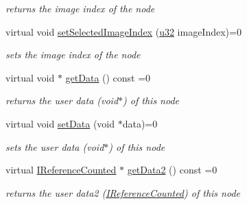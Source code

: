 \begin{DoxyCompactItemize}
\begin{DoxyCompactList}\small\item\em returns the image index of the node \end{DoxyCompactList}\item 
\mbox{\label{classirr_1_1gui_1_1IGUITreeViewNode_a21e99d3f1912e859e01b0cbc9fce638d}} 
virtual void \hyperlink{classirr_1_1gui_1_1IGUITreeViewNode_a21e99d3f1912e859e01b0cbc9fce638d}{set\+Selected\+Image\+Index} (\hyperlink{namespaceirr_a0416a53257075833e7002efd0a18e804}{u32} image\+Index)=0
\begin{DoxyCompactList}\small\item\em sets the image index of the node \end{DoxyCompactList}\item 
\mbox{\label{classirr_1_1gui_1_1IGUITreeViewNode_aa8e6747bdefb5cc8423b736c5dcefb21}} 
virtual void $\ast$ \hyperlink{classirr_1_1gui_1_1IGUITreeViewNode_aa8e6747bdefb5cc8423b736c5dcefb21}{get\+Data} () const =0
\begin{DoxyCompactList}\small\item\em returns the user data (void$\ast$) of this node \end{DoxyCompactList}\item 
\mbox{\label{classirr_1_1gui_1_1IGUITreeViewNode_a2da4071958b479dbd5799d3834a0db77}} 
virtual void \hyperlink{classirr_1_1gui_1_1IGUITreeViewNode_a2da4071958b479dbd5799d3834a0db77}{set\+Data} (void $\ast$data)=0
\begin{DoxyCompactList}\small\item\em sets the user data (void$\ast$) of this node \end{DoxyCompactList}\item 
\mbox{\label{classirr_1_1gui_1_1IGUITreeViewNode_a2fef005441c41e47a4df5c0cfd1a4b4e}} 
virtual \hyperlink{classirr_1_1IReferenceCounted}{I\+Reference\+Counted} $\ast$ \hyperlink{classirr_1_1gui_1_1IGUITreeViewNode_a2fef005441c41e47a4df5c0cfd1a4b4e}{get\+Data2} () const =0
\begin{DoxyCompactList}\small\item\em returns the user data2 (\hyperlink{classirr_1_1IReferenceCounted}{I\+Reference\+Counted}) of this node \end{DoxyCompactList}\item 

\end{DoxyCompactItemize}
